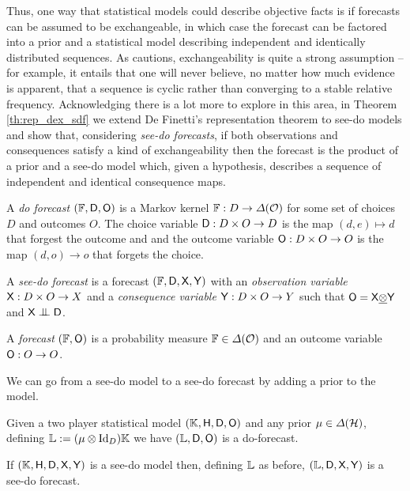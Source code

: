 Thus, one way that statistical models could describe objective facts is if forecasts can be assumed to be exchangeable, in which case the forecast can be factored into a prior and a statistical model describing  independent and identically distributed sequences. As \citet{walley_statistical_1991} cautions, exchangeability is quite a strong assumption -- for example, it entails that one will never believe, no matter how much evidence is apparent, that a sequence is cyclic rather than converging to a stable relative frequency. Acknowledging there is a lot more to explore in this area, in Theorem \ref{th:rep_dex_sdf} we extend De Finetti's representation theorem to see-do models and show that, considering \emph{see-do forecasts}, if both observations and consequences satisfy a kind of exchangeability then the forecast is the product of a prior and a see-do model which, given a hypothesis, describes a sequence of independent and identical consequence maps.

\begin{definition}\label{def:do_forecast}
A \emph{do forecast} $(\mathbb{F},\mathsf{D},\mathsf{O})$ is a Markov kernel $\mathbb{F}:D\to \Delta(\mathcal{O})$ for some set of choices $D$ and outcomes $O$. The choice variable $\mathsf{D}:D\times O\to D$ is the map $(d,e)\mapsto d$ that forgest the outcome and and the outcome variable $\mathsf{O}:D\times O\to O$ is the map $(d,o)\to o$ that forgets the choice.

A \emph{see-do forecast} is a forecast $(\mathbb{F},\mathsf{D},\mathsf{X},\mathsf{Y})$ with an \emph{observation variable} $\mathsf{X}:D\times O\to X$ and a \emph{consequence variable} $\mathsf{Y}:D\times O\to Y$ such that $\mathsf{O}=\mathsf{X}\underline{\otimes}\mathsf{Y}$ and $\RV{X}\CI\RV{D}$.

A \emph{forecast} $(\mathbb{F},\mathsf{O})$ is a probability measure $\mathbb{F}\in\Delta(\mathcal{O})$ and an outcome variable $\mathsf{O}:O\to O$.
\end{definition}

We can go from a see-do model to a see-do forecast by adding a prior to the model.

\begin{theorem}
Given a two player statistical model $(\mathbb{K},\mathsf{H},\mathsf{D},\mathsf{O})$ and any prior $\mu\in \Delta(\mathcal{H})$, defining $\mathbb{L}:=(\mu\otimes \mathrm{Id}_D)\mathbb{K}$ we have $(\mathbb{L},\mathsf{D},\mathsf{O})$ is a do-forecast. 

If $(\mathbb{K},\mathsf{H},\mathsf{D},\mathsf{X},\mathsf{Y})$ is a see-do model then, defining $\mathbb{L}$ as before, $(\mathbb{L},\mathsf{D},\mathsf{X},\mathsf{Y})$ is a see-do forecast.
\end{theorem}


